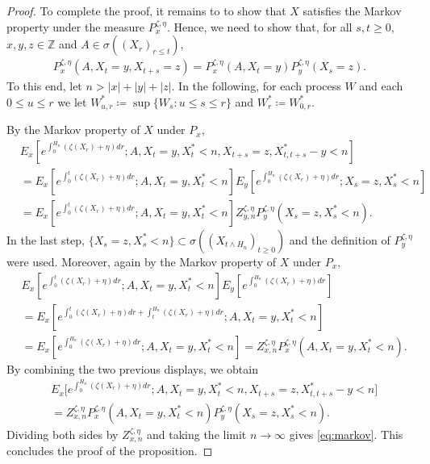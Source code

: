 \documentclass[10pt,a4paper]{amsart}
\newcommand{\Z}{\mathbb{Z}}
\begin{document}
\begin{proof}
  To complete the proof, it remains to to show that $X$ satisfies the Markov
  property under the measure $P_x^{\zeta, \eta}$. Hence, we
  need to show that, for all $s,t \geq 0$, $x,y,z \in \Z$ and
  $A\in \sigma((X_r)_{r \leq t})$,
  \begin{align}
    \label{eq:markov}
    P_x^{\zeta, \eta}(A, X_t=y, X_{t+s}=z)
    = P_x^{\zeta, \eta}(A,X_t=y ) P_y^{\zeta, \eta}(X_s=z).
  \end{align}
  To this end, let $n >|x|+|y|+|z|$. In the following, for each process $W$
  and each $0 \leq u \leq r$ we let
  $W^{*}_{u,r}\coloneq \sup \{W_s:u \leq s \leq r\}$ and $W^{*}_r\coloneq W^{*}_{0,r}$.

  By the Markov property of $X$ under $P_x$,
  \begin{align*}
    & E_x\left[ e^{\int_0^{H_{n}} (\zeta(X_r) + \eta)dr};
      A,X_t=y,X^*_t<n, X_{t+s}=z, X_{t,t+s}^{*}-y<n \right]
    \\&= E_x\left[ e^{\int_0^t (\zeta(X_r) + \eta)dr};
      A,X_t=y , X^*_t<n\right]
    E_y\left[ e^{\int_{0}^{H_{n}} (\zeta(X_r) + \eta)dr};X_s=z, X^*_s<n\right]
    \\&=E_x\left[ e^{\int_0^t (\zeta(X_r) + \eta)dr}; A,X_t=y , X^*_t<n \right]
    Z_{y,n}^{\zeta, \eta} P_y^{\zeta, \eta} (X_s=z, X^*_s<n ).
  \end{align*}
  In the last step,
  $\{X_s =z, X_s^* <n\} \subset \sigma((X_{t \wedge H_n})_{t \geq 0})$ and
  the definition of $P_y^{\zeta, \eta}$ were used. Moreover, again by the
  Markov property of $X$ under $P_x$,
  \begin{align*}
    & E_x\left[ e^{\int_0^t (\zeta(X_r) + \eta)dr}; A,X_t=y , X^*_t<n\right] E_y \left[ e^{\int_0^{H_n}(\zeta(X_r)+\eta) dr} \right] \\
    &=E_x\left[ e^{\int_0^{t} (\zeta(X_r) + \eta)dr+\int_t^{H_n} (\zeta(X_r) + \eta)dr}; A,X_t=y , X^*_t<n \right] \\
    &= E_x\left[ e^{\int_0^{H_n} (\zeta(X_r) + \eta)dr} ; A,X_t=y , X^*_t<n \right] = Z_{x,n}^{\zeta, \eta} P_{x}^{\zeta, \eta}(A,X_t=y , X^*_t<n).
  \end{align*}
  By combining the two previous displays, we obtain
  \begin{align*}
    & E_x\Big[ e^{\int_0^{H_{n}} (\zeta(X_r) + \eta)dr};
      A,X_t=y,X^*_t<n, X_{t+s}=z, X_{t,t+s}^{*}-y<n \Big] \\
    &= Z_{x,n}^{\zeta, \eta} P_{x}^{\zeta, \eta} (A,X_t=y , X^*_t<n)
    P_y^{\zeta, \eta} (X_s=z, X^*_s<n ).
  \end{align*}
  Dividing both sides
  by $Z_{x,n}^{\zeta, \eta}$ and taking the limit $n \rightarrow \infty$ gives \eqref{eq:markov}.
  This concludes the proof of the proposition.
\end{proof}
\end{document}

